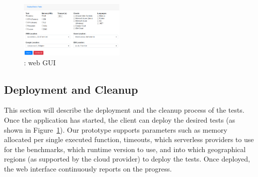 \begin{figure}[!t]
\begin{center}
\includegraphics[width=0.45\textwidth]{bilder/ui.png}
\captionsetup{justification=centering, labelfont=bf}
\caption{\sys: web GUI}
\label{fig:ui}
\end{center}
\end{figure}

\subsection{Deployment and Cleanup}
This section will describe the deployment and the cleanup process of the tests.
Once the application has started, the client can deploy the desired tests (as shown in Figure~\ref{fig:ui}).
Our prototype supports parameters such as memory allocated per single executed function, timeouts, which serverless providers to use for the benchmarks, which runtime version to use, and into which geographical regions (as supported by the cloud provider) to deploy the tests. 
Once deployed, the web interface continuously reports on the progress. 
